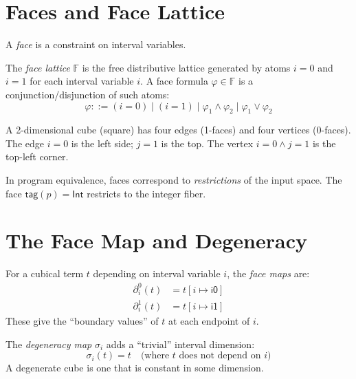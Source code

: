 \section{Faces and Face Lattice}

A \emph{face} is a constraint on interval variables.

\begin{definition}
The \emph{face lattice} $\mathbb{F}$ is the free distributive lattice
generated by atoms $i = 0$ and $i = 1$ for each interval variable $i$.
A face formula $\varphi \in \mathbb{F}$ is a conjunction/disjunction of
such atoms:
\[
  \varphi ::= (i = 0) \mid (i = 1) \mid \varphi_1 \land \varphi_2
  \mid \varphi_1 \lor \varphi_2
\]
\end{definition}

\begin{example}
A 2-dimensional cube (square) has four edges (1-faces) and four vertices
(0-faces).  The edge $i = 0$ is the left side; $j = 1$ is the top.
The vertex $i = 0 \land j = 1$ is the top-left corner.
\end{example}

In program equivalence, faces correspond to \emph{restrictions} of
the input space.  The face $\mathsf{tag}(p) = \mathsf{Int}$ restricts
to the integer fiber.

\section{The Face Map and Degeneracy}

\begin{definition}
For a cubical term $t$ depending on interval variable $i$, the
\emph{face maps} are:
\begin{align}
  \partial_i^0(t) &= t[i \mapsto \mathsf{i0}] \\
  \partial_i^1(t) &= t[i \mapsto \mathsf{i1}]
\end{align}
These give the ``boundary values'' of $t$ at each endpoint of $i$.
\end{definition}

\begin{definition}
The \emph{degeneracy map} $\sigma_i$ adds a ``trivial'' interval
dimension:
\[
  \sigma_i(t) = t \quad \text{(where $t$ does not depend on $i$)}
\]
A degenerate cube is one that is constant in some dimension.
\end{definition}

